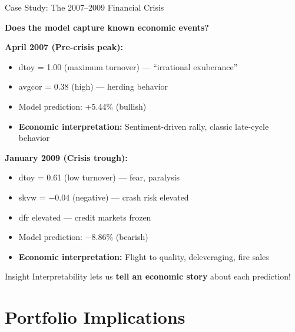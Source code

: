 \documentclass[10pt]{beamer}
\newcommand{\highlight}[1]{\textcolor{AccentOrange}{\textbf{#1}}}
\begin{document}
\begin{frame}{Case Study: The 2007--2009 Financial Crisis}

  \textbf{Does the model capture known economic events?}

  \vspace{0.5em}
  \textbf{April 2007 (Pre-crisis peak):}
  \begin{itemize}
    \item dtoy = 1.00 (maximum turnover) --- ``irrational exuberance''
    \item avgcor = 0.38 (high) --- herding behavior
    \item Model prediction: +5.44\% (bullish)
    \item \textbf{Economic interpretation:} Sentiment-driven rally, classic late-cycle behavior
  \end{itemize}

  \vspace{0.5em}
  \textbf{January 2009 (Crisis trough):}
  \begin{itemize}
    \item dtoy = 0.61 (low turnover) --- fear, paralysis
    \item skvw = $-$0.04 (negative) --- crash risk elevated
    \item dfr elevated --- credit markets frozen
    \item Model prediction: $-$8.86\% (bearish)
    \item \textbf{Economic interpretation:} Flight to quality, deleveraging, fire sales
  \end{itemize}

  \vspace{0.3em}
  \begin{block}{Insight}
    Interpretability lets us \highlight{tell an economic story} about each prediction!
  \end{block}
\end{frame}

\section{Portfolio Implications}
\end{document}
